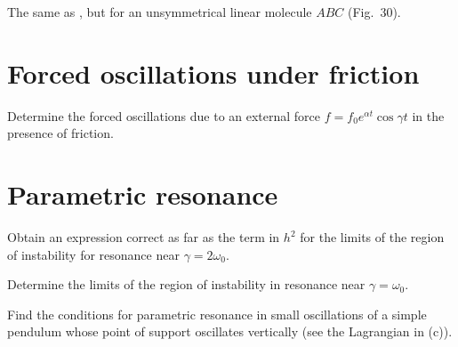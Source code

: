 
\begin{problem}[title={Unsymmetrical linear triatomic molecule modes}]
{
The same as , but for an unsymmetrical linear molecule $ABC$ (Fig.~30).
}
{}
{}
\end{problem}

\section{Forced oscillations under friction}


\begin{problem}[title={Damped oscillator, modulated driving force}]
{
Determine the forced oscillations due to an external force $f = f_0 e^{\alpha t} \cos{\gamma t}$ in the presence of friction.
}
{}
{}
\end{problem}

\section{Parametric resonance}


\begin{problem}[title={Second-order instability limits near \texorplain{$\gamma = 2\omega_0$}{γ = 2ω₀}}]
{
Obtain an expression correct as far as the term in $h^2$ for the limits of the region of instability for resonance near $\gamma = 2\omega_0$.
}
{}
{}
\end{problem}


\begin{problem}[title={Region of instability near \texorplain{$\gamma = \omega_0$}{γ = ω₀}}]
{
Determine the limits of the region of instability in resonance near $\gamma = \omega_0$.
}
{}
{}
\end{problem}


\begin{problem}[title={Parametric resonance with a vibrating pivot}]
{
Find the conditions for parametric resonance in small oscillations of a simple pendulum whose point of support oscillates vertically (see the Lagrangian in (c)).
}
{}
{}
\end{problem}

